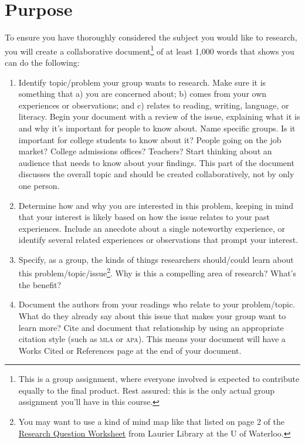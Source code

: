 \documentclass[12pt,oneside]{amsart}	%
\begin{document}
\section{Purpose} %
\label{sec:purpose}
To ensure you have thoroughly considered the subject you would like to research, you will create a collaborative document\footnote{This is a group assignment, where everyone involved is expected to contribute equally to the final product. Rest assured: this is the only actual group assignment you'll have in this course.} of at least 1,000 words that shows you can do the following:
\begin{enumerate}
	\item Identify topic/problem your group wants to research. Make sure it is something that a) you are concerned about; b) comes from your own experiences or observations; and c) relates to reading, writing, language, or literacy. Begin your document with a review of the issue, explaining what it is and why it's important for people to know about. Name specific groups. Is it important for college students to know about it? People going on the job market? College admissions offices? Teachers? Start thinking about an audience that needs to know about your findings. This part of the document discusses the overall topic and should be created collaboratively, not by only one person.
	\item  Determine how and why you are interested in this problem, keeping in mind that your interest is likely based on how the issue relates to your past experiences. Include an anecdote about a single noteworthy experience, or identify several related experiences or observations that prompt your interest.
	\item  Specify, as a group, the kinds of things researchers should/could learn about this problem/topic/issue\footnote{You may want to use a kind of mind map like that listed on page 2 of the \href{http://library.wlu.ca/sites/all/pdf/research_question_worksheet.pdf}{Research Question Worksheet} from Laurier Library at the U of Waterloo.}. Why is this a compelling area of research? What's the benefit?
	\item  Document the authors from your readings who relate to your problem/topic. What do they already say about this issue that makes your group want to learn more? Cite and document that relationship by using an appropriate citation style (such as \textsc{mla} or \textsc{apa}). This means your document will have a Works Cited or References page at the end of your document.
\end{enumerate}
\end{document}
